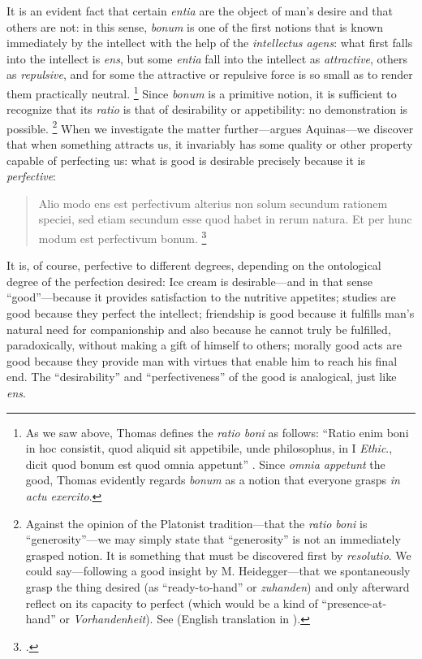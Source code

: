 {It is an evident fact that certain \emph{entia} are the object of man's desire and that others are not: in this sense, \emph{bonum} is one of the first notions that is known immediately by the intellect with the help of the \emph{intellectus agens}: what first falls into the intellect is \emph{ens}, but some \emph{entia} fall into the intellect as \emph{attractive}, others as \emph{repulsive}, and for some the attractive or repulsive force is so small as to render them practically neutral.%
%
\footnote{As we saw above, Thomas defines the \emph{ratio boni} as follows: ``Ratio enim boni in hoc consistit, quod aliquid sit appetibile, unde philosophus, in I \emph{Ethic}., dicit quod bonum est quod omnia appetunt'' \parencite[I, q.~5, a.~1, co.]{st:summa}. Since \emph{omnia appetunt} the good, Thomas evidently regards \emph{bonum} as a notion that everyone grasps \emph{in actu exercito}.}
%
Since \emph{bonum} is a primitive notion, it is sufficient to recognize that its \emph{ratio} is that of desirability or appetibility: no demonstration is possible.%
%
\footnote{Against the opinion of the Platonist tradition---that the \emph{ratio boni} is ``generosity''---we may simply state that ``generosity'' is not an immediately grasped notion. It is something that must be discovered first by \emph{resolutio}. We could say---following a good insight by M. Heidegger---that we spontaneously grasp the thing desired (as ``ready-to-hand'' or \emph{zuhanden}) and only afterward reflect on its capacity to perfect (which would be a kind of ``presence-at-hand'' or \emph{Vorhandenheit}). See \cite[42 and 69]{heidegger:being} (English translation in \cite[67 and 98]{heidegger:being:en}).}
%
When we investigate the matter further---argues Aquinas---we discover that when something attracts us, it invariably has some quality or other property capable of perfecting us: what is good is desirable precisely because it is \emph{perfective}:%
%
\begin{quotation}
Alio modo ens est perfectivum alterius non solum secundum rationem speciei, sed etiam secundum esse quod habet in rerum natura. Et per hunc modum est perfectivum bonum.%
%
\footcite[q.~21, a.~1, co.]{st:deveritate}
%
\end{quotation}%
%
It is, of course, perfective to different degrees, depending on the ontological degree of the perfection desired: Ice cream is desirable---and in that sense ``good''---because it provides satisfaction to the nutritive appetites; studies are good because they perfect the intellect; friendship is good because it fulfills man's natural need for companionship and also because he cannot truly be fulfilled, paradoxically, without making a gift of himself to others; morally good acts are good because they provide man with virtues that enable him to reach his final end. The ``desirability'' and ``perfectiveness'' of the good is analogical, just like \emph{ens}.

}

